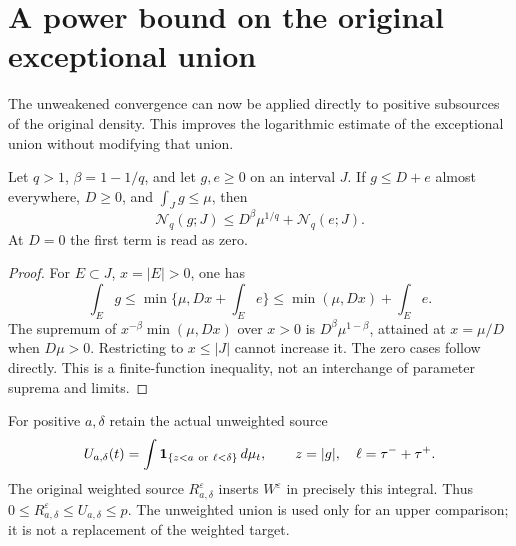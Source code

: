\section{A power bound on the original exceptional union}
\label{sec:v91-exceptional}
The unweakened convergence can now be applied directly to positive
subsources of the original density. This improves the logarithmic
estimate of the exceptional union without modifying that union.

\begin{lemma}
\label{lem:v91-domination}
Let $q>1$, $\beta=1-1/q$, and let $g,e\ge0$ on an interval $J$.
If $g\le D+e$ almost everywhere, $D\ge0$, and
$\int_Jg\le\mu$, then
\begin{equation}\label{eq:v91-domination}
 \mathcal N_q(g;J)\le D^\beta\mu^{1/q}
                                      +\mathcal N_q(e;J).
\end{equation}
At $D=0$ the first term is read as zero.
\end{lemma}
\begin{proof}
For $E\subset J$, $x=|E|>0$, one has
\[
 \int_Eg\le\min\{\mu,Dx+\int_Ee\}
                 \le\min(\mu,Dx)+\int_Ee.
\]
The supremum of $x^{-\beta}\min(\mu,Dx)$ over $x>0$ is
$D^\beta\mu^{1-\beta}$, attained at $x=\mu/D$ when
$D\mu>0$. Restricting to $x\le |J|$ cannot increase it.
The zero cases follow directly. This is a finite-function inequality,
not an interchange of parameter suprema and limits.
\end{proof}

For positive $a,\delta$ retain the actual unweighted source
\begin{equation}\label{eq:v91-union}
 U_{a,\delta}(t)=\int
        \one_{\{z<a\ \mathrm{or}\ \ell<\delta\}}\,d\mu_t,
 \qquad z=|g|,\quad \ell=\tau^-+\tau^+.
\end{equation}
The original weighted source $R_{a,\delta}^\varepsilon$ inserts
$W^\varepsilon$ in precisely this integral. Thus
$0\le R_{a,\delta}^\varepsilon\le U_{a,\delta}\le p$.
The unweighted union is used only for an upper comparison; it is
not a replacement of the weighted target.

